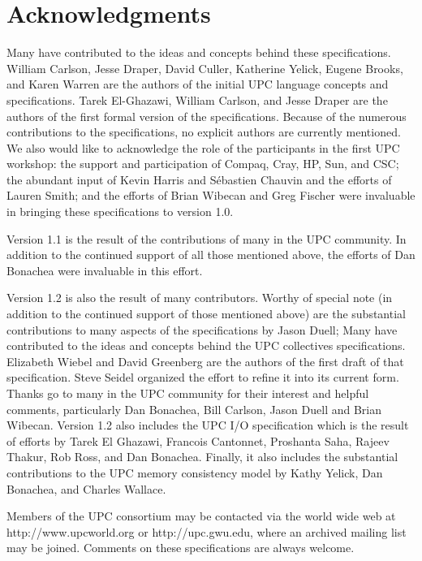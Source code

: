 \section*{Acknowledgments}
                                             
\npf Many have contributed to the ideas and concepts behind
    these specifications.  William Carlson, Jesse Draper,  David Culler, 
Katherine Yelick,
Eugene Brooks, and Karen Warren are the authors of the initial
UPC language concepts and specifications. Tarek El-Ghazawi, 
William Carlson, and Jesse Draper are the authors of the first formal
version of the specifications.  Because of the numerous contributions
to the specifications, no explicit authors are currently mentioned.
We also would like to
acknowledge the role of the participants in the first UPC workshop:
the support and participation of Compaq, Cray, HP, Sun,
and CSC; the abundant input of
Kevin Harris and S\'{e}bastien Chauvin and the efforts of Lauren
Smith; and the efforts of Brian Wibecan and Greg Fischer were
invaluable in bringing these specifications to version 1.0.

\np Version 1.1 is the result of the contributions of many in the UPC
community.  In addition to the
continued support of all those mentioned above, the efforts of Dan
Bonachea were invaluable in this effort.

\np Version 1.2 is also the result of many contributors.  Worthy of special
note (in addition to the
continued support of those mentioned above) are the substantial 
contributions to many aspects of the specifications by Jason Duell;
Many have contributed to the ideas and concepts behind the
UPC collectives specifications.
Elizabeth Wiebel and David Greenberg are the authors of the first draft of
that specification.  Steve Seidel organized the effort to
refine it into its current form.
Thanks go to many in the UPC community for their interest and helpful
comments, particularly Dan Bonachea, Bill Carlson, Jason Duell and
Brian Wibecan.
Version 1.2 also includes the UPC I/O specification which is the result of
efforts by Tarek El Ghazawi, Francois Cantonnet, Proshanta Saha, Rajeev Thakur,
Rob Ross, and Dan Bonachea.
Finally, it also includes the substantial contributions to the UPC memory consistency
model by Kathy Yelick, Dan Bonachea, and Charles Wallace.

\np Members of the UPC consortium may be contacted via the world wide
web at
http://www.upcworld.org or http://upc.gwu.edu, where an archived mailing list
may be joined.  Comments on these specifications are always welcome.
